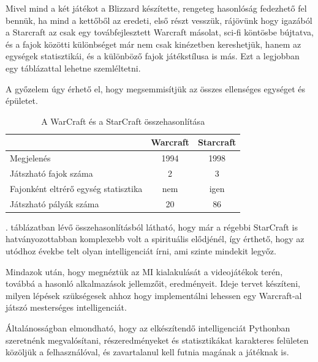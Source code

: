 
Mivel mind a két játékot a Blizzard készítette, rengeteg hasonlóság fedezhető fel bennük, ha mind a kettőből az eredeti, első részt vesszük, rájövünk hogy igazából a Starcraft az csak egy továbfejlesztett Warcraft másolat, sci-fi köntösbe bújtatva, és a fajok közötti különbséget már nem csak kinézetben kereshetjük, hanem az egységek statisztikái, és a különböző fajok játékstílusa is más. Ezt a legjobban egy táblázattal lehetne szemléltetni.

A győzelem úgy érhető el, hogy megsemmisítjük az összes ellenséges egységet és épületet.

\begin{table}[h]
    \centering
    \caption{A WarCraft és a StarCraft összehasonlítása}
    \label{tab:osszehasonlitas}
    \medskip
    \begin{tabular}{|l|c|c|}
    \hline
    ~ & Warcraft & Starcraft \\
    \hline
    Megjelenés & 1994 & 1998 \\
    Játszható fajok száma & 2 & 3 \\
    Fajonként eltrérő egység statisztika & nem & igen \\
    Játszható pályák száma & 20 & 86 \\
    \hline
    \end{tabular}
\end{table}

. táblázatban lévő összehasonlításból látható, hogy már a régebbi StarCraft is hatványozottabban komplexebb volt a spirituális elődjénél, így érthető, hogy az utódhoz évekbe telt olyan intelligenciát írni, ami szinte mindekit legyőz.


Mindazok után, hogy megnéztük az MI kialakulását a videojátékok terén, továbbá a hasonló alkalmazások jellemzőit, eredményeit. Ideje tervet készíteni, milyen lépések szükségesek ahhoz hogy implementálni lehessen egy Warcraft-al játszó mesterséges intelligenciát.

Általánosságban elmondható, hogy az elkészítendő intelligenciát Pythonban szeretnénk megvalósítani, részeredményeket és statisztikákat karakteres felületen közöljük a felhasználóval, és zavartalanul kell futnia magának a játéknak is.


